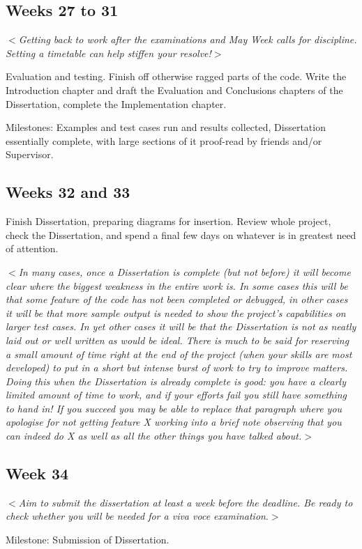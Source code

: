 \documentclass[12pt]{article}
\newcommand{\al}{$<$}
\newcommand{\ar}{$>$}
\begin{document}
\subsection*{Weeks 27 to 31}

\al\emph{Getting back to work after the examinations and May Week
  calls for discipline.  Setting a timetable can help stiffen your
  resolve!}\ar

Evaluation and testing.  Finish off otherwise ragged parts of the
code.  Write the Introduction chapter and draft the Evaluation and
Conclusions chapters of the Dissertation, complete the Implementation
chapter.

Milestones: Examples and test cases run and results collected,
Dissertation essentially complete, with large sections of it
proof-read by friends and/or Supervisor.


\subsection*{Weeks 32 and 33}

Finish Dissertation, preparing diagrams for insertion.  Review whole
project, check the Dissertation, and spend a final few days on
whatever is in greatest need of attention.

\al\emph{In many cases, once a Dissertation is complete (but not
  before) it will become clear where the biggest weakness in the
  entire work is.  In some cases this will be that some feature of the
  code has not been completed or debugged, in other cases it will be
  that more sample output is needed to show the project's capabilities
  on larger test cases.  In yet other cases it will be that the
  Dissertation is not as neatly laid out or well written as would be
  ideal.  There is much to be said for reserving a small amount of
  time right at the end of the project (when your skills are most
  developed) to put in a short but intense burst of work to try to
  improve matters.  Doing this when the Dissertation is already
  complete is good: you have a clearly limited amount of time to work,
  and if your efforts fail you still have something to hand in!  If
  you succeed you may be able to replace that paragraph where you
  apologise for not getting feature X working into a brief note
  observing that you can indeed do X as well as all the other things
  you have talked about.}\ar


\subsection*{Week 34}

\al\emph{Aim to submit the dissertation at least a week before the
  deadline. Be ready to check whether you will be needed for a\/ {\rm
    viva voce} examination}.\ar

Milestone: Submission of Dissertation. 
\end{document}
